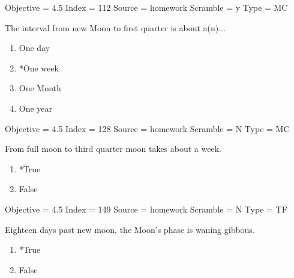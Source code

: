 \documentclass[11pt]{article}
\begin{document}
\begin{enumerate}
\begin{minipage}{\textwidth}
\begin{minipage}{\textwidth}
Objective = 4.5
Index = 112
Source = homework
Scramble = y
Type = MC
\end{minipage}
\end{minipage}
\vskip 0.20in

\begin{minipage}{\textwidth}
\begin{minipage}{\textwidth}
\item The interval from new Moon to first quarter is about a(n)...
\begin{multicols}{3}
\begin{enumerate} 
\setlength{\itemsep}{1pt} 
\setlength{\parskip}{0pt} 
\setlength{\parsep}{0pt}
\setlength{\multicolsep}{1pt} 
\item One day
\item *One week
\item One Month
\item One year
\end{enumerate} 
\vfill 
\end{multicols}

Objective = 4.5
Index = 128
Source = homework
Scramble = N
Type = MC
\end{minipage}
\end{minipage}
\vskip 0.20in

\begin{minipage}{\textwidth}
\begin{minipage}{\textwidth}
\item From full moon to third quarter moon takes about a week.
\begin{multicols}{3}
\begin{enumerate} 
\setlength{\itemsep}{1pt} 
\setlength{\parskip}{0pt} 
\setlength{\parsep}{0pt}
\setlength{\multicolsep}{1pt} 
\item *True
\item False
\end{enumerate} 
\vfill 
\end{multicols}

Objective = 4.5
Index = 149
Source = homework
Scramble = N
Type = TF
\end{minipage}
\end{minipage}
\vskip 0.20in

\begin{minipage}{\textwidth}
\begin{minipage}{\textwidth}
\item Eighteen days past new moon, the Moon's phase is waning gibbous.
\begin{multicols}{3}
\begin{enumerate} 
\setlength{\itemsep}{1pt} 
\setlength{\parskip}{0pt} 
\setlength{\parsep}{0pt}
\setlength{\multicolsep}{1pt} 
\item *True
\item False
\end{enumerate} 
\vfill 
\end{multicols}


\end{minipage}
\end{minipage}
\end{enumerate}
\end{document}
